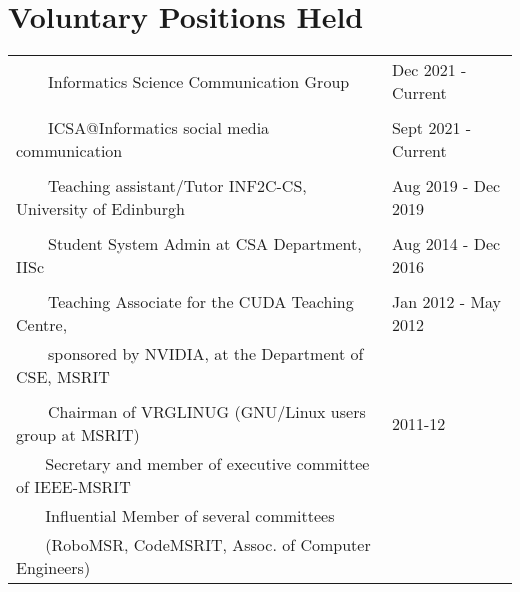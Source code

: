 \documentclass[a4paper,10pt]{article} %
\newcommand{\tabitem}{~~\llap{\textbullet}~~}
\begin{document}
\section{Voluntary Positions Held}
\hskip-0.4cm
\begin{tabular}{ll}
	\tabitem Informatics Science Communication Group & Dec 2021 - Current \\
	&\\
	\tabitem ICSA@Informatics social media communication & Sept 2021 - Current \\
	& \\
	\tabitem Teaching assistant/Tutor INF2C-CS, University of Edinburgh & Aug 2019 - Dec 2019 \\
	& \\
	\tabitem Student System Admin at CSA Department, IISc & Aug 2014 - Dec 2016 \\
	&\\
	\tabitem Teaching Associate for the CUDA Teaching Centre,  & Jan 2012 - May 2012\\
	~~~~sponsored by NVIDIA, at the Department of CSE, MSRIT &  \\
	&\\
	\tabitem Chairman of VRGLINUG (GNU/Linux users group at MSRIT) & 2011-12 \\
	~~~ Secretary and member of executive committee of IEEE-MSRIT &  \\
	~~~ Influential Member of several committees & \\
	~~~ {\footnotesize (RoboMSR, CodeMSRIT, Assoc. of Computer Engineers)} & \\
\end{tabular}


\iffalse
\end{document}
